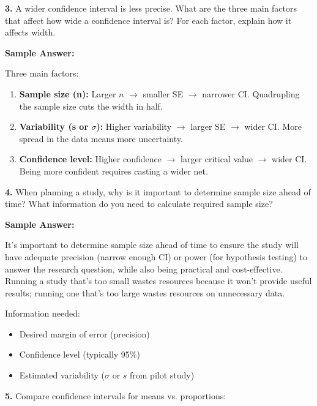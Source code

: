\documentclass[11pt]{article}
\begin{document}
\vspace{6pt}

\textbf{3.} A wider confidence interval is less precise. What are the three main factors that affect how wide a confidence interval is? For each factor, explain how it affects width.

\textcolor{answergreen}{\textbf{Sample Answer:}}

Three main factors:
\begin{enumerate}
\item \textbf{Sample size (n):} Larger $n$ $\rightarrow$ smaller SE $\rightarrow$ narrower CI. Quadrupling the sample size cuts the width in half.
\item \textbf{Variability (s or $\sigma$):} Higher variability $\rightarrow$ larger SE $\rightarrow$ wider CI. More spread in the data means more uncertainty.
\item \textbf{Confidence level:} Higher confidence $\rightarrow$ larger critical value $\rightarrow$ wider CI. Being more confident requires casting a wider net.
\end{enumerate}

\vspace{6pt}

\textbf{4.} When planning a study, why is it important to determine sample size ahead of time? What information do you need to calculate required sample size?

\textcolor{answergreen}{\textbf{Sample Answer:}}

It's important to determine sample size ahead of time to ensure the study will have adequate precision (narrow enough CI) or power (for hypothesis testing) to answer the research question, while also being practical and cost-effective. Running a study that's too small wastes resources because it won't provide useful results; running one that's too large wastes resources on unnecessary data.

Information needed:
\begin{itemize}
\item Desired margin of error (precision)
\item Confidence level (typically 95\%)
\item Estimated variability ($\sigma$ or $s$ from pilot study)
\end{itemize}

\vspace{6pt}

\textbf{5.} Compare confidence intervals for means vs. proportions:
\end{document}
